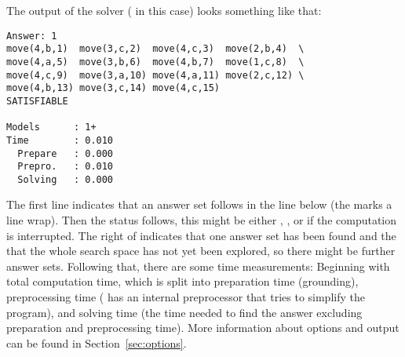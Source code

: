 The output of the solver (\clingo{} in this case) looks something like that:
\begin{lstlisting}[numbers=none]
Answer: 1
move(4,b,1)  move(3,c,2)  move(4,c,3)  move(2,b,4)  \
move(4,a,5)  move(3,b,6)  move(4,b,7)  move(1,c,8)  \
move(4,c,9)  move(3,a,10) move(4,a,11) move(2,c,12) \
move(4,b,13) move(3,c,14) move(4,c,15) 
SATISFIABLE

Models      : 1+    
Time        : 0.010
  Prepare   : 0.000
  Prepro.   : 0.010
  Solving   : 0.000
\end{lstlisting}
The first line indicates that an answer set follows in the line below (the \code{\textbackslash} marks a line wrap).
Then the status follows, this might be either , , or  
if the computation is interrupted.
The \code{1+} right of \code{Models:} indicates that one answer set has been found and the \code{+} that 
the whole search space has not yet been explored, so there might be further answer sets.
Following that, there are some time measurements: 
Beginning with total computation time, 
which is split into 
preparation time (grounding), 
preprocessing time (\clasp{} has an internal preprocessor that tries to simplify the program), 
and solving time (the time needed to find the answer excluding preparation and preprocessing time).
More information about options and output can be found in Section~\ref{sec:options}.
